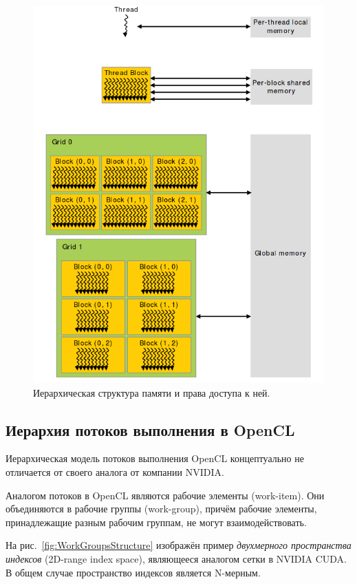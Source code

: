\begin{figure}[p]
\centering
\includegraphics[width=1\textwidth]{include/graphics/image3}
\caption{Иерархическая структура памяти и права доступа к ней.}
\label{fig:MemoryStructure}
\end{figure}

\subsection{Иерархия потоков выполнения в OpenCL}

Иерархическая модель потоков выполнения OpenCL концептуально не отличается от 
своего аналога от компании NVIDIA.

Аналогом потоков в OpenCL являются рабочие элементы (work-item). Они
объединяются в рабочие группы (work-group), причём рабочие элементы, принадлежащие разным рабочим группам, не могут взаимодействовать.

На рис.~\ref{fig:WorkGroupsStructure} изображён пример \textit{двухмерного пространства индексов} (2D-range index space), являющееся аналогом сетки в NVIDIA CUDA. В общем случае пространство индексов является N-мерным.

